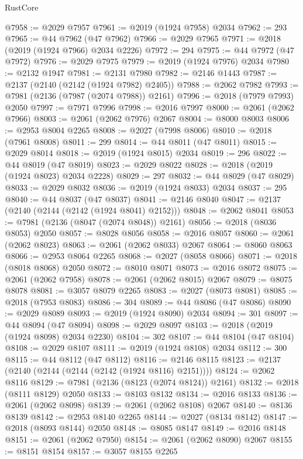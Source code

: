 \begin{lexlean}{RustCore}
\begin{coremodule}
@7958 := @2029 @7957
@7961 := @2019 (@1924 @7958) @2034
@7962 := 293
@7965 := @44 @7962 (@47 @7962)
@7966 := @2029 @7965
@7971 := @2018 (@2019 (@1924 @7966) @2034 @2226)
@7972 := 294
@7975 := @44 @7972 (@47 @7972)
@7976 := @2029 @7975
@7979 := @2019 (@1924 @7976) @2034
@7980 := @2132 @1947
@7981 := @2131 @7980
@7982 := @2146 @1443
@7987 := @2137 (@2140 (@2142 (@1924 @7982) @2405))
@7988 := @2062 @7982
@7993 := @7981 (@2136 (@7987 (@2074 @7988)) @2161)
@7996 := @2018 (@7979 @7993) @2050
@7997 := @7971 @7996
@7998 := @2016 @7997
@8000 := @2061 (@2062 @7966)
@8003 := @2061 (@2062 @7976) @2067
@8004 := @8000 @8003
@8006 := @2953 @8004 @2265
@8008 := @2027 (@7998 @8006)
@8010 := @2018 (@7961 @8008)
@8011 := 299
@8014 := @44 @8011 (@47 @8011)
@8015 := @2029 @8014
@8018 := @2019 (@1924 @8015) @2034
@8019 := 296
@8022 := @44 @8019 (@47 @8019)
@8023 := @2029 @8022
@8028 := @2018 (@2019 (@1924 @8023) @2034 @2228)
@8029 := 297
@8032 := @44 @8029 (@47 @8029)
@8033 := @2029 @8032
@8036 := @2019 (@1924 @8033) @2034
@8037 := 295
@8040 := @44 @8037 (@47 @8037)
@8041 := @2146 @8040
@8047 := @2137 (@2140 (@2144 (@2142 (@1924 @8041) @2152)))
@8048 := @2062 @8041
@8053 := @7981 (@2136 (@8047 (@2074 @8048)) @2161)
@8056 := @2018 (@8036 @8053) @2050
@8057 := @8028 @8056
@8058 := @2016 @8057
@8060 := @2061 (@2062 @8023)
@8063 := @2061 (@2062 @8033) @2067
@8064 := @8060 @8063
@8066 := @2953 @8064 @2265
@8068 := @2027 (@8058 @8066)
@8071 := @2018 (@8018 @8068) @2050
@8072 := @8010 @8071
@8073 := @2016 @8072
@8075 := @2061 (@2062 @7958)
@8078 := @2061 (@2062 @8015) @2067
@8079 := @8075 @8078
@8081 := @3057 @8079 @2265
@8083 := @2027 (@8073 @8081)
@8085 := @2018 (@7953 @8083)
@8086 := 304
@8089 := @44 @8086 (@47 @8086)
@8090 := @2029 @8089
@8093 := @2019 (@1924 @8090) @2034
@8094 := 301
@8097 := @44 @8094 (@47 @8094)
@8098 := @2029 @8097
@8103 := @2018 (@2019 (@1924 @8098) @2034 @2230)
@8104 := 302
@8107 := @44 @8104 (@47 @8104)
@8108 := @2029 @8107
@8111 := @2019 (@1924 @8108) @2034
@8112 := 300
@8115 := @44 @8112 (@47 @8112)
@8116 := @2146 @8115
@8123 := @2137 (@2140 (@2144 (@2144 (@2142 (@1924 @8116) @2151))))
@8124 := @2062 @8116
@8129 := @7981 (@2136 (@8123 (@2074 @8124)) @2161)
@8132 := @2018 (@8111 @8129) @2050
@8133 := @8103 @8132
@8134 := @2016 @8133
@8136 := @2061 (@2062 @8098)
@8139 := @2061 (@2062 @8108) @2067
@8140 := @8136 @8139
@8142 := @2953 @8140 @2265
@8144 := @2027 (@8134 @8142)
@8147 := @2018 (@8093 @8144) @2050
@8148 := @8085 @8147
@8149 := @2016 @8148
@8151 := @2061 (@2062 @7950)
@8154 := @2061 (@2062 @8090) @2067
@8155 := @8151 @8154
@8157 := @3057 @8155 @2265

\end{coremodule}
\end{lexlean}
